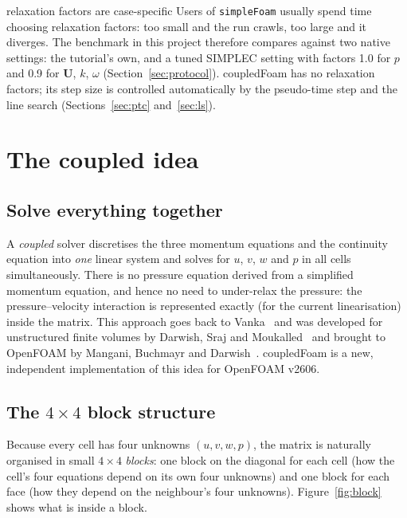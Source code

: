 \documentclass[11pt,a4paper]{article}
\newcommand{\vect}[1]{\mathbf{#1}}
\newcommand{\Uv}{\vect{U}}
\newcommand{\code}[1]{\texttt{#1}}
\begin{document}
\begin{whyitmatters}{relaxation factors are case-specific}
  Users of \code{simpleFoam} usually spend time choosing relaxation
  factors: too small and the run crawls, too large and it diverges. The
  benchmark in this project therefore compares against two native settings:
  the tutorial's own, and a tuned SIMPLEC setting with factors 1.0 for $p$
  and 0.9 for $\Uv$, $k$, $\omega$ (Section~\ref{sec:protocol}).
  coupledFoam has no relaxation factors; its step size is controlled
  automatically by the pseudo-time step and the line search
  (Sections~\ref{sec:ptc} and~\ref{sec:ls}).
\end{whyitmatters}

\section{The coupled idea}\label{sec:coupled}

\subsection{Solve everything together}

A \emph{coupled} solver discretises the three momentum equations and the
continuity equation into \emph{one} linear system and solves for $u$, $v$,
$w$ and $p$ in all cells simultaneously. There is no pressure equation
derived from a simplified momentum equation, and hence no need to
under-relax the pressure: the pressure--velocity interaction is represented
exactly (for the current linearisation) inside the matrix. This approach
goes back to Vanka~\cite{Vanka1986} and was developed for unstructured
finite volumes by Darwish, Sraj and Moukalled~\cite{Darwish2007,Darwish2009}
and brought to OpenFOAM by Mangani, Buchmayr and
Darwish~\cite{Mangani2014a,Mangani2014b}. coupledFoam is a new,
independent implementation of this idea for OpenFOAM v2606.

\subsection{The \texorpdfstring{$4\times4$}{4x4} block structure}\label{sec:blocks44}

Because every cell has four unknowns $(u,v,w,p)$, the matrix is naturally
organised in small $4\times4$ \emph{blocks}: one block on the diagonal for
each cell (how the cell's four equations depend on its own four unknowns)
and one block for each face (how they depend on the neighbour's four
unknowns). Figure~\ref{fig:block} shows what is inside a block.
\end{document}
